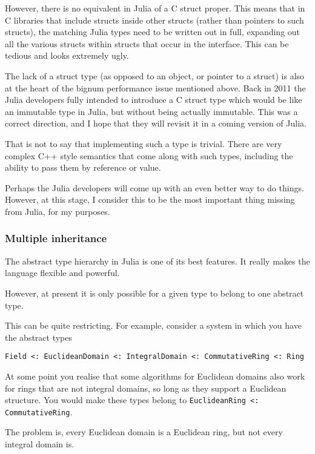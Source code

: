 \documentclass[a4paper,10pt]{article}
\newcommand{\code}{\lstinline}
\begin{document}
However, there is no equivalent in Julia of a C struct proper. This means that in C libraries that
include structs inside other structs (rather than pointers to such structs), the matching Julia types
need to be written out in full, expanding out all the various structs within structs that occur in
the interface. This can be tedious and looks extremely ugly.

The lack of a struct type (as opposed to an object, or pointer to a struct) is also at the heart of
the bignum performance issue mentioned above. Back in 2011 the Julia developers fully intended to
introduce a C struct type which would be like an immutable type in Julia, but without being actually
immutable. This was a correct direction, and I hope that they will revisit it in a coming version of
Julia.

That is not to say that implementing such a type is trivial. There are very complex C++ style
semantics that come along with such types, including the ability to pass them by reference or value.

Perhaps the Julia developers will come up with an even better way to do things. However, at this
stage, I consider this to be the most important thing missing from Julia, for my purposes.

\subsubsection{Multiple inheritance}

The abstract type hierarchy in Julia is one of its best features. It really makes the language
flexible and powerful.

However, at present it is only possible for a given type to belong to one abstract type.

This can be quite restricting. For example, consider a system in which you have the abstract types

\begin{lstlisting}
Field <: EuclideanDomain <: IntegralDomain <: CommutativeRing <: Ring
\end{lstlisting}

At some point you realise that some algorithms for Euclidean domains also work for rings that are
not integral domains, so long as they support a Euclidean structure. You would make these types
belong to \code{EuclideanRing <: CommutativeRing}. 

The problem is, every Euclidean domain is a Euclidean ring, but not every integral domain is.
\end{document}
